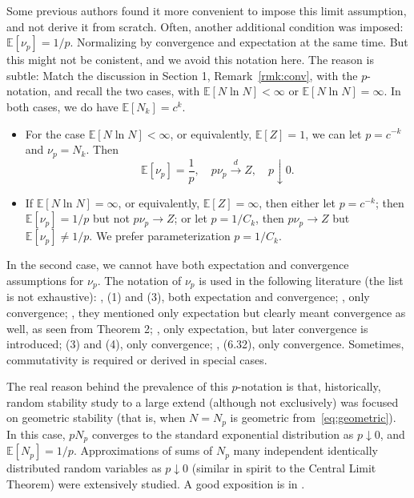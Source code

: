 \documentclass[12pt]{amsart}
\theoremstyle{remark}
\theoremstyle{definition}
\begin{document}
Some previous authors found it more convenient to impose this limit assumption, and not derive it from scratch. Often, another additional condition was imposed: $\mathbb E[\nu_p] = 1/p$. Normalizing by convergence and expectation at the same time. But this might not be conistent, and we avoid this notation here. The reason is subtle: Match the discussion in Section 1, Remark~\ref{rmk:conv}, with the $p$-notation, and recall the two cases, with $\mathbb E[N\ln N] < \infty$ or $\mathbb E[N\ln N] = \infty$. In both cases, we do have $\mathbb E[N_k] = c^k$.

\begin{itemize}
\item For the case $\mathbb E[N\ln N] < \infty$, or equivalently, $\mathbb E[Z] = 1$, we can let $p = c^{-k}$ and $\nu_p = N_k$. Then 
$$
\mathbb E[\nu_p] = \frac1p,\quad p\nu_p \stackrel{d}{\to} Z,\quad p \downarrow 0.
$$
\item If $\mathbb E[N\ln N] = \infty$, or equivalently, $\mathbb E[Z] = \infty$, then either let $p = c^{-k}$; then $\mathbb E[\nu_p] = 1/p$ but not $p\nu_p \to Z$; or let $p = 1/C_k$, then $p\nu_p \to Z$ but  $\mathbb E[\nu_p] \ne 1/p$. We prefer parameterization $p = 1/C_k$. 
\end{itemize}

In the second case, we cannot have both expectation and convergence assumptions for $\nu_p$. The notation of $\nu_p$ is used in the following literature (the list is not exhaustive): \cite[Section 2]{Melamed}, (1) and (3), both expectation and convergence; \cite[Section 1]{Anna}, only convergence; \cite[page 304]{Stable}, they mentioned only expectation but clearly meant convergence as well, as seen from Theorem 2; \cite[Section 2]{Klebanov}, only expectation, but later convergence is introduced; \cite[Section 2]{Anna} (3) and (4), only convergence; \cite[Chapter 4]{GnedenkoBook}, (6.32), only convergence. Sometimes, commutativity is required or derived in special cases. 

The real reason behind the prevalence of this $p$-notation is that, historically, random stability study to a large extend (although not exclusively) was focused on geometric stability (that is, when $N = N_p$ is geometric from~\eqref{eq:geometric}). In this case, $pN_p$ converges to the standard exponential distribution as $p \downarrow 0$, and $\mathbb E[N_p] = 1/p$. Approximations of sums of $N_p$ many independent identically distributed random variables as $p \downarrow 0$ (similar in spirit to the Central Limit Theorem) were extensively studied. A good exposition is in \cite[Chapter 9]{KKRbook}. 
\end{document}
